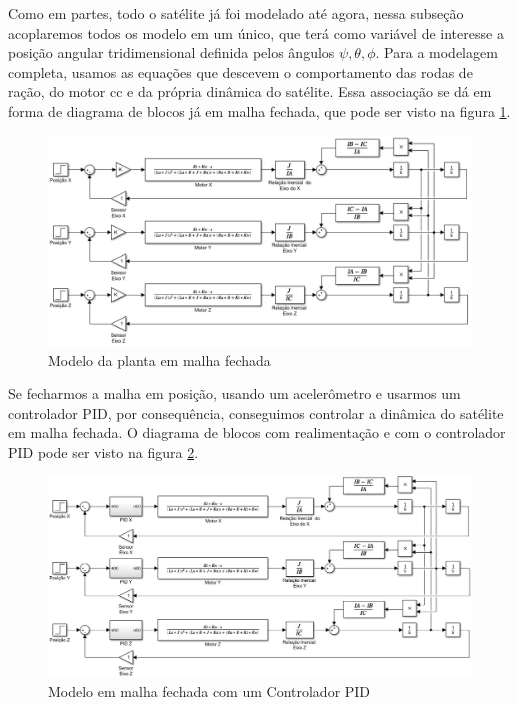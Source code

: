 Como em partes, todo o satélite já foi modelado até agora, nessa subseção acoplaremos todos os modelo em um único, que terá como variável de interesse a posição angular tridimensional definida pelos ângulos $\psi, \theta, \phi$. Para a modelagem completa, usamos as equações que descevem o comportamento das rodas de ração, do motor cc e da própria dinâmica do satélite. Essa associação se dá em forma de diagrama de blocos já em malha fechada, que pode ser visto na figura \ref{fig:simulink_modelo_completo_aberto}.

\begin{figure}[H]
  \caption{Modelo da planta em malha fechada}
  \begin{center}
      \includegraphics[scale=.55]{metodologia/img/simulink_modelo_completo_aberto}
  \end{center}
  \label{fig:simulink_modelo_completo_aberto}
\end{figure}

Se fecharmos a malha em posição, usando um acelerômetro e usarmos um controlador PID, por consequência, conseguimos controlar a dinâmica do satélite em malha fechada. O diagrama de blocos com realimentação e com o controlador PID pode ser visto na figura \ref{fig:modelo_satelite_pid}. 

\begin{figure}[H]
  \caption{Modelo em malha fechada com um Controlador PID}
  \begin{center}
      \includegraphics[scale=.5]{metodologia/img/modelo_satelite_pid}
  \end{center}
  \label{fig:modelo_satelite_pid}
\end{figure}

